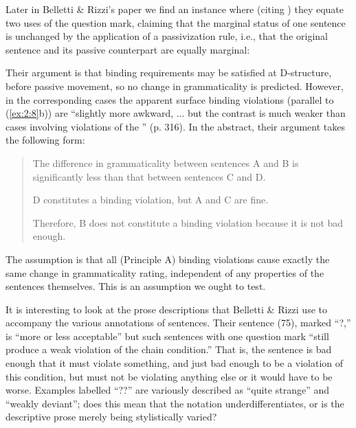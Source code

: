 Later in Belletti \& Rizzi's paper we find an instance where (citing \citet{Burzio1981}) they equate two uses of the question mark, claiming that the marginal status of one sentence is unchanged by the application of a passivization rule, i.e., that the original sentence and its passive counterpart are equally marginal:

\begin{exe} 
\ex \label{ex:2:8}
\begin{xlista}
\end{xlista}
\end{exe}

\noindent
Their argument is that binding requirements may be satisfied at D-structure, before passive movement, so no change in grammaticality is predicted. However, in the corresponding  cases the apparent surface binding violations (parallel to (\ref{ex:2:8}b))
are ``slightly more awkward, ... but the contrast is much weaker than cases involving violations of the '' (p. 316). In the abstract, their argument takes the following form:

\begin{quote}
The difference in grammaticality between sentences A and B is significantly less than that between sentences C and D.\medskip

D constitutes a binding violation, but A and C are fine.\medskip

Therefore, B does not constitute a binding violation because it is not bad enough.
\end{quote}


\noindent
The assumption is that all (Principle A) binding violations cause exactly the same change in grammaticality rating, independent of any properties of the sentences themselves. This is an assumption we ought to test.
 
It is interesting to look at the prose descriptions that Belletti \& Rizzi use to accompany the various annotations of sentences. Their sentence (75), marked ``?,'' is ``more or less acceptable'' but such sentences with one question mark ``still produce a weak violation of the chain condition.'' That is, the sentence is bad enough that it must violate something, and just bad enough to be a violation of this condition, but must not be violating anything else or it would have to be worse. Examples labelled ``??'' are variously described as ``quite strange'' and ``weakly deviant''; does this mean that the notation underdifferentiates, or is the descriptive prose merely being stylistically varied?

